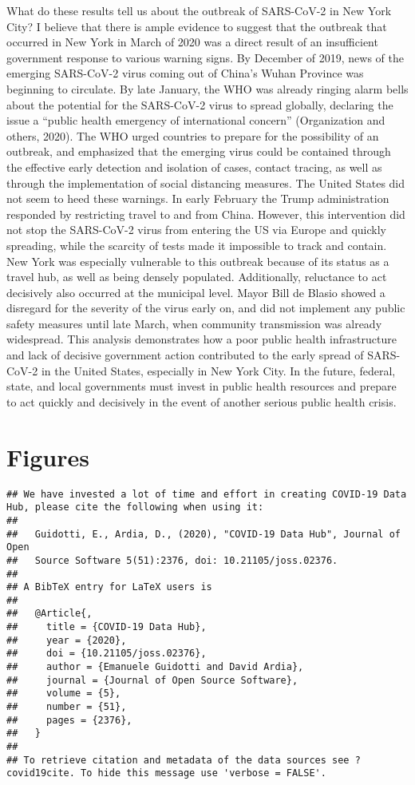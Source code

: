 \documentclass[
]{article}
\begin{document}
What do these results tell us about the outbreak of SARS-CoV-2 in New
York City? I believe that there is ample evidence to suggest that the
outbreak that occurred in New York in March of 2020 was a direct result
of an insufficient government response to various warning signs. By
December of 2019, news of the emerging SARS-CoV-2 virus coming out of
China's Wuhan Province was beginning to circulate. By late January, the
WHO was already ringing alarm bells about the potential for the
SARS-CoV-2 virus to spread globally, declaring the issue a ``public
health emergency of international concern'' (Organization and others,
2020). The WHO urged countries to prepare for the possibility of an
outbreak, and emphasized that the emerging virus could be contained
through the effective early detection and isolation of cases, contact
tracing, as well as through the implementation of social distancing
measures. The United States did not seem to heed these warnings. In
early February the Trump administration responded by restricting travel
to and from China. However, this intervention did not stop the
SARS-CoV-2 virus from entering the US via Europe and quickly spreading,
while the scarcity of tests made it impossible to track and contain. New
York was especially vulnerable to this outbreak because of its status as
a travel hub, as well as being densely populated. Additionally,
reluctance to act decisively also occurred at the municipal level. Mayor
Bill de Blasio showed a disregard for the severity of the virus early
on, and did not implement any public safety measures until late March,
when community transmission was already widespread. This analysis
demonstrates how a poor public health infrastructure and lack of
decisive government action contributed to the early spread of SARS-CoV-2
in the United States, especially in New York City. In the future,
federal, state, and local governments must invest in public health
resources and prepare to act quickly and decisively in the event of
another serious public health crisis.

\hypertarget{figures}{%
\section{Figures}\label{figures}}

\begin{verbatim}
## We have invested a lot of time and effort in creating COVID-19 Data Hub, please cite the following when using it:
## 
##   Guidotti, E., Ardia, D., (2020), "COVID-19 Data Hub", Journal of Open
##   Source Software 5(51):2376, doi: 10.21105/joss.02376.
## 
## A BibTeX entry for LaTeX users is
## 
##   @Article{,
##     title = {COVID-19 Data Hub},
##     year = {2020},
##     doi = {10.21105/joss.02376},
##     author = {Emanuele Guidotti and David Ardia},
##     journal = {Journal of Open Source Software},
##     volume = {5},
##     number = {51},
##     pages = {2376},
##   }
## 
## To retrieve citation and metadata of the data sources see ?covid19cite. To hide this message use 'verbose = FALSE'.
\end{verbatim}
\end{document}
